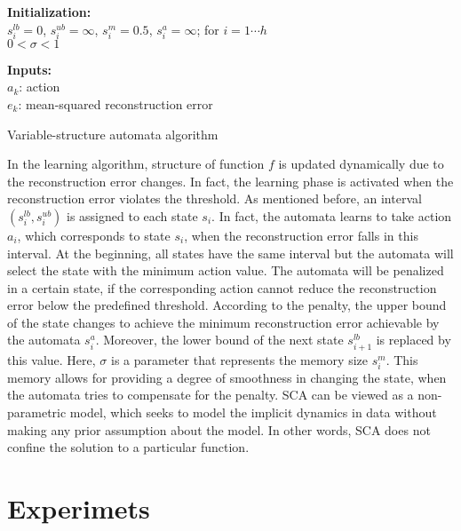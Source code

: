 \documentclass[journal]{IEEEtran}
\begin{document}
\begin{algorithm} \label{algorithm2}
\SetAlgoLined

\textbf{Initialization:} \\
$s_i^{lb}=0$, $s_i^{ub}=\infty$, $s_i^m=0.5$, $s_i^a=\infty$; for $i=1 \cdots h$ \\
$0 < \sigma < 1$

\textbf{Inputs:} \\
$a_k$: action \\
$e_k$: mean-squared reconstruction error

\caption{Variable-structure automata algorithm}
\end{algorithm}


In the learning algorithm, structure of function $f$ is updated dynamically due to the reconstruction error changes. In fact, the learning phase is activated when the reconstruction error violates the threshold. As mentioned before, an interval $(s_i^{lb},s_i^{ub})$ is assigned to each state $s_i$. In fact, the automata learns to take action $a_i$, which corresponds to state $s_i$, when the reconstruction error falls in this interval. At the beginning, all states have the same interval but the automata will select the state with the minimum action value. The automata will be penalized in a certain state, if the corresponding action cannot reduce the reconstruction error below the predefined threshold. According to the penalty, the upper bound of the state changes to achieve the minimum reconstruction error achievable by the automata $s_i^a$. Moreover, the lower bound of the next state $s_{i+1}^{lb}$ is replaced by this value. Here, $\sigma$ is a parameter that represents the memory size $s_i^m$. This memory allows for providing a degree of smoothness in changing the state, when the automata tries to compensate for the penalty. SCA can be viewed as a non-parametric model, which seeks to model the implicit dynamics in data without making any prior assumption about the model. In other words, SCA does not confine the solution to a particular function.


\section{Experimets} 
\label{experiment}
\end{document}
